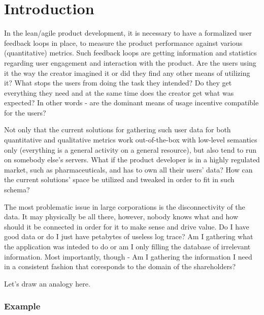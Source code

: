 \chapter{Introduction}

In the lean/agile product development, it is necessary to have a formalized user feedback loops in place, to measure the product performance against various (quantitative) metrics. Such feedback loops are getting information and statistics regarding user engagement and interaction with the product. Are the users using it the way the creator imagined it or did they find any other means of utilizing it? What stops the users from doing the task they intended? Do they get everything they need and at the same time does the creator get what was expected? In other words - are the dominant means of usage incentive compatible for the users? 

Not only that the current solutions for gathering such user data for both quantitative and qualitative metrics work out-of-the-box with low-level semantics only (everything is a general activity on a general resource), but also tend to run on somebody else's servers. What if the product developer is in a highly regulated market, such as pharmaceuticals, and has to own all their users' data? How can the current solutions' space be utilized and tweaked in order to fit in such schema?

The most problematic issue in large corporations is the disconnectivity of the data. It may physically be all there, however, nobody knows what and how should it be connected in order for it to make sense and drive value. Do I have good data or do I just have petabytes of useless log trace? Am I gathering what the application was inteded to do or am I only filling the database of irrelevant information. Most importantly, though - Am I gathering the information I need in a consistent fashion that coresponds to the domain of the shareholders?

Let's draw an analogy here.

\subsection*{Example}

